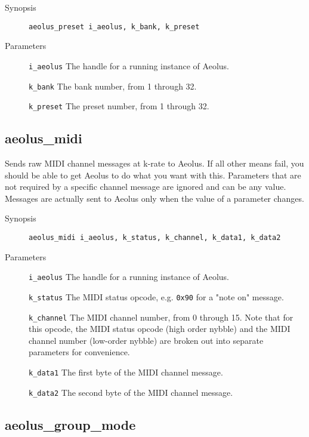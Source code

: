 \documentclass[english,11pt,letterpaper,onecolumn]{scrartcl}
\begin{document}
{\begin{description}
	\item[Synopsis]
	\item[]\lstinline|aeolus_preset i_aeolus, k_bank, k_preset|
	\item[Parameters]
	\item[]\lstinline|i_aeolus| The handle for a running instance of Aeolus.
	\item[]\lstinline|k_bank| The bank number, from 1 through 32.
	\item[]\lstinline|k_preset| The preset number, from 1 through 32.
\end{description}

\subsection*{aeolus\_midi}

Sends raw MIDI channel messages at k-rate to Aeolus. If all other means fail, you should be able to get Aeolus to do what you want with this. Parameters that are not required by a specific channel message are ignored and can be any value. Messages are actually sent to Aeolus only when the value of a parameter changes.

\begin{description}
	\item[Synopsis]
	\item[]\lstinline|aeolus_midi i_aeolus, k_status, k_channel, k_data1, k_data2|
	\item[Parameters]
	\item[]\lstinline|i_aeolus| The handle for a running instance of Aeolus.
	\item[]\lstinline|k_status| The MIDI status opcode, e.g. \verb|0x90| for a "note on" message.
	\item[]\lstinline|k_channel| The MIDI channel number, from 0 through 15. Note that for this opcode, the MIDI status opcode (high order nybble) and the MIDI channel number (low-order nybble) are broken out into separate parameters for convenience.
	\item[]\lstinline|k_data1| The first byte of the MIDI channel message.
	\item[]\lstinline|k_data2| The second byte of the MIDI channel message.
\end{description}

\subsection*{aeolus\_group\_mode}

}
\end{document}
